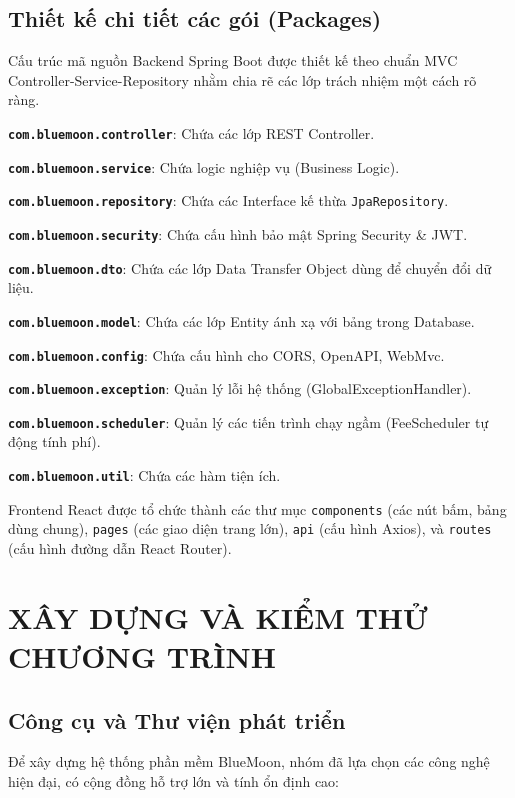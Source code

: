 \documentclass[12pt,a4paper]{article}
\begin{document}
\subsection{Thiết kế chi tiết các gói (Packages)}

Cấu trúc mã nguồn Backend Spring Boot được thiết kế theo chuẩn MVC Controller-Service-Repository nhằm chia rẽ các lớp trách nhiệm một cách rõ ràng.

    \item \textbf{\texttt{com.bluemoon.controller}}: Chứa các lớp REST Controller.
    \item \textbf{\texttt{com.bluemoon.service}}: Chứa logic nghiệp vụ (Business Logic).
    \item \textbf{\texttt{com.bluemoon.repository}}: Chứa các Interface kế thừa \texttt{JpaRepository}.
    \item \textbf{\texttt{com.bluemoon.security}}: Chứa cấu hình bảo mật Spring Security \& JWT.
    \item \textbf{\texttt{com.bluemoon.dto}}: Chứa các lớp Data Transfer Object dùng để chuyển đổi dữ liệu.
    \item \textbf{\texttt{com.bluemoon.model}}: Chứa các lớp Entity ánh xạ với bảng trong Database.
    \item \textbf{\texttt{com.bluemoon.config}}: Chứa cấu hình cho CORS, OpenAPI, WebMvc.
    \item \textbf{\texttt{com.bluemoon.exception}}: Quản lý lỗi hệ thống (GlobalExceptionHandler).
    \item \textbf{\texttt{com.bluemoon.scheduler}}: Quản lý các tiến trình chạy ngầm (FeeScheduler tự động tính phí).
    \item \textbf{\texttt{com.bluemoon.util}}: Chứa các hàm tiện ích.

Frontend React được tổ chức thành các thư mục \texttt{components} (các nút bấm, bảng dùng chung), \texttt{pages} (các giao diện trang lớn), \texttt{api} (cấu hình Axios), và \texttt{routes} (cấu hình đường dẫn React Router).

\section{XÂY DỰNG VÀ KIỂM THỬ CHƯƠNG TRÌNH}

\subsection{Công cụ và Thư viện phát triển}

Để xây dựng hệ thống phần mềm BlueMoon, nhóm đã lựa chọn các công nghệ hiện đại, có cộng đồng hỗ trợ lớn và tính ổn định cao:
\end{document}
